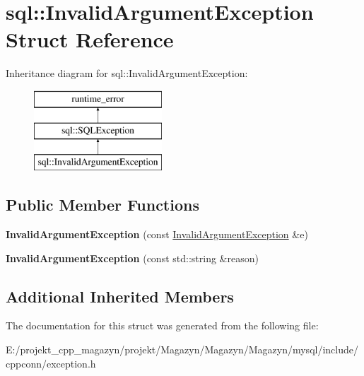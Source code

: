 \hypertarget{structsql_1_1_invalid_argument_exception}{}\section{sql\+:\+:Invalid\+Argument\+Exception Struct Reference}
\label{structsql_1_1_invalid_argument_exception}
Inheritance diagram for sql\+:\+:Invalid\+Argument\+Exception\+:\begin{figure}[H]
\begin{center}
\leavevmode
\includegraphics[height=3.000000cm]{structsql_1_1_invalid_argument_exception}
\end{center}
\end{figure}
\subsection*{Public Member Functions}
\begin{DoxyCompactItemize}
\item 
\hypertarget{structsql_1_1_invalid_argument_exception_a2598c1564255a696d5da59ffa76d8ad7}{}\label{structsql_1_1_invalid_argument_exception_a2598c1564255a696d5da59ffa76d8ad7} 
{\bfseries Invalid\+Argument\+Exception} (const \hyperlink{structsql_1_1_invalid_argument_exception}{Invalid\+Argument\+Exception} \&e)
\item 
\hypertarget{structsql_1_1_invalid_argument_exception_a3d98490d7f4ed27ea593983daa6d1aee}{}\label{structsql_1_1_invalid_argument_exception_a3d98490d7f4ed27ea593983daa6d1aee} 
{\bfseries Invalid\+Argument\+Exception} (const std\+::string \&reason)
\end{DoxyCompactItemize}
\subsection*{Additional Inherited Members}


The documentation for this struct was generated from the following file\+:\begin{DoxyCompactItemize}
\item 
E\+:/projekt\+\_\+cpp\+\_\+magazyn/projekt/\+Magazyn/\+Magazyn/\+Magazyn/mysql/include/cppconn/exception.\+h\end{DoxyCompactItemize}
